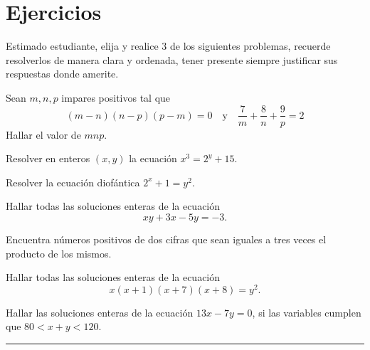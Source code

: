 \section*{Ejercicios}

Estimado estudiante, elija y realice 3 de los siguientes problemas, recuerde resolverlos de manera clara y ordenada,
tener presente siempre justificar sus respuestas donde amerite.

\begin{prob-without-section}
    Sean $m,n,p$ impares positivos tal que
    \[
        (m - n)(n - p)(p - m) = 0\quad \text{y} \quad \frac{7}{m} + \frac{8}{n} + \frac{9}{p} = 2
    \]
    Hallar el valor de $mnp$.
\end{prob-without-section}

\begin{prob-without-section}
    Resolver en enteros $(x,y)$ la ecuación $x^3 = 2^y + 15$.
\end{prob-without-section}

\begin{prob-without-section}
    Resolver la ecuación diofántica $2^x + 1 = y^2$.
\end{prob-without-section}

\begin{prob-without-section}
    Hallar todas las soluciones enteras de la ecuación
    \[
        xy + 3x - 5y = -3.
    \]
\end{prob-without-section}

\begin{prob-without-section}
    Encuentra números positivos de dos cifras que sean iguales a tres veces el producto de los mismos.
\end{prob-without-section}

\begin{prob-without-section}
    Hallar todas las soluciones enteras de la ecuación
    \[
        x(x + 1)(x + 7)(x + 8) = y^2.
    \]
\end{prob-without-section}

\begin{prob-without-section}
    Hallar las soluciones enteras de la ecuación $13x - 7y = 0$, si las variables cumplen que $80 < x + y < 120$.
\end{prob-without-section}
\hrule